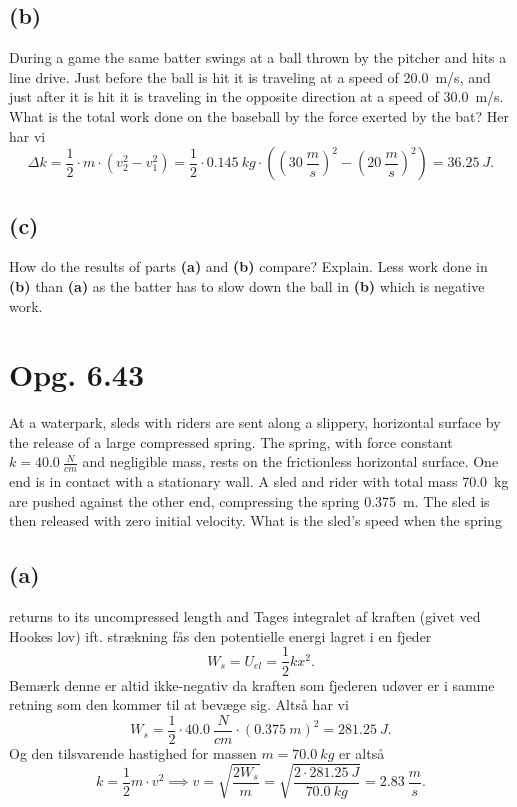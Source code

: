 \documentclass[12pt]{article}
\begin{document}
\subsection*{(b)}
During a game the same batter swings at a ball thrown by the pitcher and hits a line drive. Just before the ball is hit it is traveling at a speed of \qty{20,0}{m/s}, and just after it is hit it is traveling in the opposite direction at a speed of \qty{30,0}{m/s}. What is the total work done on the baseball by the force exerted by the bat?
\bigbreak
Her har vi
\[
\Delta k = \frac{1}{2}\cdot m\cdot \left( v_2^2-v_1^2 \right) = \frac{1}{2}\cdot \qty{0,145}{kg}\cdot \left( \left( \qty{30}{\frac{m}{s}} \right)^2 - \left( \qty{20}{\frac{m}{s}} \right)^2  \right) = \qty{36,25}{J}
.\] 

\subsection*{(c)}
How do the results of parts \textbf{(a)} and \textbf{(b)} compare? Explain.
\bigbreak
Less work done in \textbf{(b)} than \textbf{(a)} as the batter has to slow down the ball in \textbf{(b)} which is negative work.


\section*{Opg. 6.43}
At a waterpark, sleds with riders are sent along a slippery, horizontal surface by the release of a large compressed spring. The spring, with force constant $k = \qty{40,0}{\frac{N}{cm}}$ and negligible mass, rests on the frictionless horizontal surface. One end is in contact with a stationary wall. A sled and rider with total mass \qty{70,0}{kg} are pushed against the other end, compressing the spring \qty{0,375}{m}. The sled is then released with zero initial velocity. What is the sled’s speed when the spring

\subsection*{(a)}
returns to its uncompressed length and
\bigbreak
Tages integralet af kraften (givet ved Hookes lov) ift. strækning fås den potentielle energi lagret i en fjeder
\[
W_s = U_{el} = \frac{1}{2}kx^2
.\] 
Bemærk denne er altid ikke-negativ da kraften som fjederen udøver er i samme retning som den kommer til at bevæge sig. Altså har vi
\[
W_s = \frac{1}{2}\cdot \qty{40,0}{\frac{N}{cm}}\cdot \left( \qty{0,375}{m} \right)^2 = \qty{281,25}{J}
.\] 
Og den tilsvarende hastighed for massen $m = \qty{70,0}{kg}$ er altså
\[
  k = \frac{1}{2}m\cdot v^2 \implies v = \sqrt{\frac{2W_s}{m}} = \sqrt{\frac{2\cdot \qty{281,25}{J}}{\qty{70,0}{kg}}} = \qty{2,83}{\frac{m}{s}} 
.\] 
\end{document}
